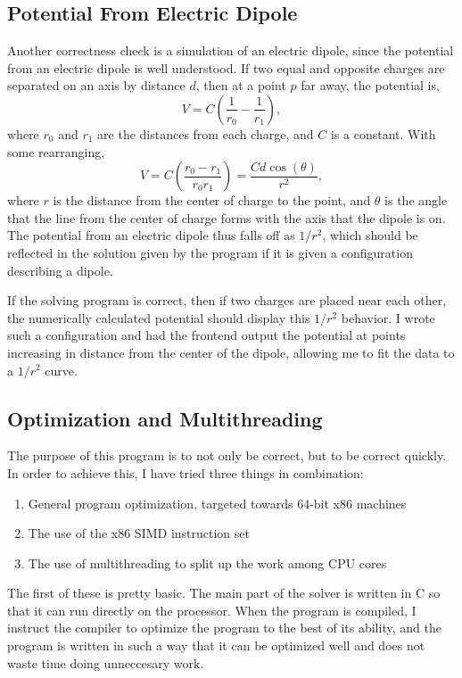 \subsection{Potential From Electric Dipole}
Another correctness check is a simulation of an electric dipole, since the potential from an electric dipole is well understood.
If two equal and opposite charges are separated on an axis by distance $d$, then at a point $p$ far away, the
potential is,
$$V = C\left(\frac{1}{r_0} - \frac{1}{r_1}\right),$$
where $r_0$ and $r_1$ are the distances from each charge, and $C$ is a constant. With some rearranging,
$$V = C\left(\frac{r_0 - r_1}{r_0 r_1}\right) = \frac{C d \cos(\theta)}{r^2},$$
where $r$ is the distance from the center of charge to the point, and $\theta$ is the angle that the line from the
center of charge forms with the axis that the dipole is on\cite{griffiths}. The potential from an electric dipole thus falls off as $1/r^2$,
which should be reflected in the solution given by the program if it is given a configuration describing a dipole.

If the solving program is correct, then if two charges are placed near each other, the numerically calculated potential
should display this $1/r^2$ behavior. I wrote such a configuration and had the frontend output the potential at points
increasing in distance from the center of the dipole, allowing me to fit the data to a $1/r^2$ curve.


\subsection{Optimization and Multithreading}
The purpose of this program is to not only be correct, but to be correct quickly. In order to achieve this, I have
tried three things in combination:
\begin{enumerate}
\item General program optimization, targeted towards 64-bit x86 machines
\item The use of the x86 SIMD instruction set
\item The use of multithreading to split up the work among CPU cores
\end{enumerate}
The first of these is pretty basic. The main part of the solver is written in C so that it can run directly on the
processor. When the program is compiled, I instruct the compiler to optimize the program to the best of its ability,
and the program is written in such a way that it can be optimized well and does not waste time doing unneccesary work.


